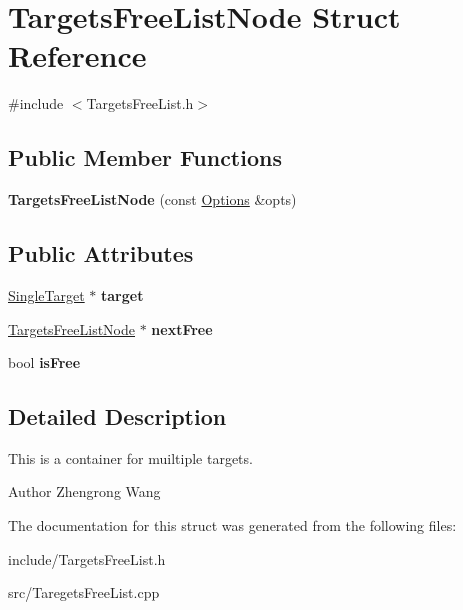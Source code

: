 \hypertarget{structTargetsFreeListNode}{}\section{Targets\+Free\+List\+Node Struct Reference}
\label{structTargetsFreeListNode}


{\ttfamily \#include $<$Targets\+Free\+List.\+h$>$}

\subsection*{Public Member Functions}
\begin{DoxyCompactItemize}
\item 
\hypertarget{structTargetsFreeListNode_a284166a631a189cc0334638d0efe53a6}{}{\bfseries Targets\+Free\+List\+Node} (const \hyperlink{structOptions}{Options} \&opts)\label{structTargetsFreeListNode_a284166a631a189cc0334638d0efe53a6}

\end{DoxyCompactItemize}
\subsection*{Public Attributes}
\begin{DoxyCompactItemize}
\item 
\hypertarget{structTargetsFreeListNode_a4bf1b8d2ee5e3246617e4d19ddf3be59}{}\hyperlink{classSingleTarget}{Single\+Target} $\ast$ {\bfseries target}\label{structTargetsFreeListNode_a4bf1b8d2ee5e3246617e4d19ddf3be59}

\item 
\hypertarget{structTargetsFreeListNode_aebb8068d83b31f62286dae8a0397694a}{}\hyperlink{structTargetsFreeListNode}{Targets\+Free\+List\+Node} $\ast$ {\bfseries next\+Free}\label{structTargetsFreeListNode_aebb8068d83b31f62286dae8a0397694a}

\item 
\hypertarget{structTargetsFreeListNode_a3b6838264c70e578fe8958903359788e}{}bool {\bfseries is\+Free}\label{structTargetsFreeListNode_a3b6838264c70e578fe8958903359788e}

\end{DoxyCompactItemize}


\subsection{Detailed Description}
This is a container for muiltiple targets.

\begin{DoxyAuthor}{Author}
Zhengrong Wang 
\end{DoxyAuthor}


The documentation for this struct was generated from the following files\+:\begin{DoxyCompactItemize}
\item 
include/Targets\+Free\+List.\+h\item 
src/Taregets\+Free\+List.\+cpp\end{DoxyCompactItemize}
